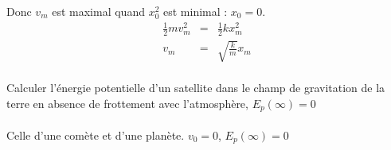 Donc $v_m$ est maximal quand $x_0^2$ est minimal : $x_0 = 0$.
\[\begin{array}{rcl}
	\frac{1}{2} mv_m^2 &=& \frac{1}{2}kx_m^2 \\
v_m &=& \sqrt{\frac{k}{m}}x_m\end{array}\]

\paragraph{} Calculer l'énergie potentielle d'un satellite dans le champ de gravitation de la terre en absence de frottement avec l'atmosphère, $E_p(\infty) = 0$

\paragraph{} Celle d'une comète et d'une planète. $v_0 = 0$, $E_p(\infty) = 0$
